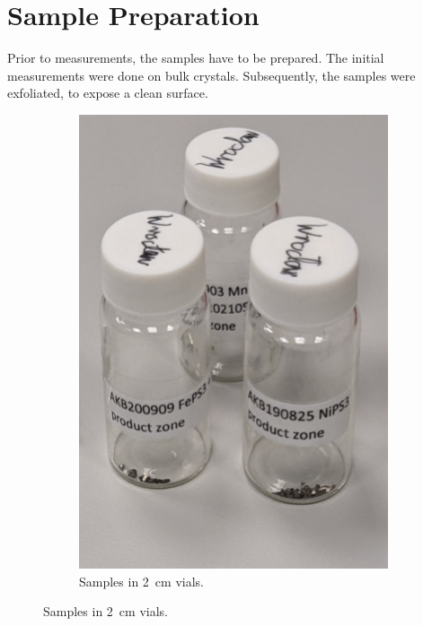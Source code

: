 \documentclass[
	oneside,
	parskip=half,
	a4paper,
]{scrbook}
\begin{document}
\section{Sample Preparation}
Prior to measurements, the samples have to be prepared.
The initial measurements were done on bulk crystals.
Subsequently, the samples were exfoliated, to expose a clean surface.
\begin{figure}
	\centering
	\begin{subfigure}[t]{.25\textwidth}
		\vskip 0pt
		\includegraphics[width=\textwidth]{../../photos/bulk_sample.jpg}
		\caption{Samples in \SI{2}{cm} vials.}
		\label{fig:samples_vials}
	\end{subfigure}

\end{figure}
\end{document}
